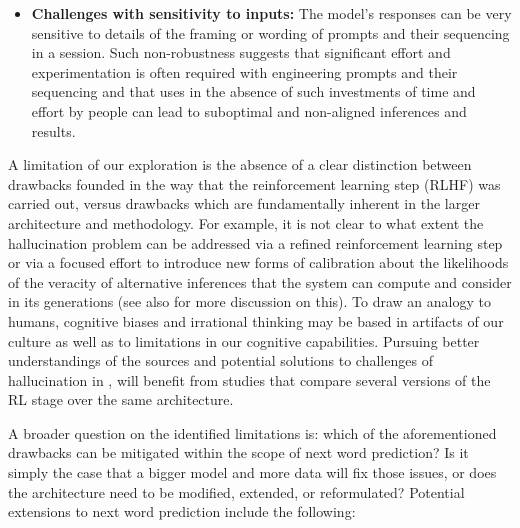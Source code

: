 \begin{itemize}
     \item \textbf{Challenges with sensitivity to inputs:} The model's responses can be very sensitive to details of the framing or wording of prompts and their sequencing in a session. Such non-robustness suggests that significant effort and experimentation is often required with engineering prompts and their sequencing and that uses in the absence of such investments of time and effort by people can lead to suboptimal and non-aligned inferences and results. 
\end{itemize}

A limitation of our exploration is the absence of a clear distinction between drawbacks founded in the way that the reinforcement learning step (RLHF) was carried out, versus drawbacks which are fundamentally inherent in the larger architecture and methodology. For example, it is not clear to what extent the hallucination problem can be addressed via a refined reinforcement learning step or via a focused effort to introduce new forms of calibration about the likelihoods of the veracity of alternative inferences that the system can compute and consider in its generations (see also \cite{gpt4} for more discussion on this). To draw an analogy to humans, cognitive biases and irrational thinking may be based in artifacts of our culture as well as to limitations in our cognitive capabilities. Pursuing better understandings of the sources and potential solutions to challenges of hallucination in \DV, will benefit from studies that compare several versions of the RL stage over the same architecture.
\newline

A broader question on the identified limitations is: which of the aforementioned drawbacks can be mitigated within the scope of next word prediction? Is it simply the case that a bigger model and more data will fix those issues, or does the architecture need to be modified, extended, or reformulated? Potential extensions to next word prediction include the following:

